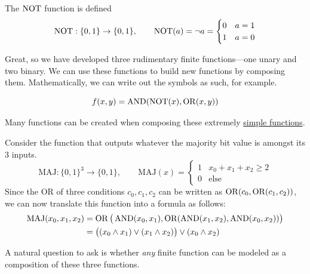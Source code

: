   \begin{definition}
    \label{def:not-function}
    The $\operatorname{NOT}$ function is defined 
    \begin{equation}
      \operatorname{NOT}: \{0,1\} \to \{0,1\}, \qquad 
      \operatorname{NOT} (a) = \lnot a = \begin{cases}
        0 & a = 1 \\
        1 & a = 0
      \end{cases}
    \end{equation}
  \end{definition}

  Great, so we have developed three rudimentary finite functions---one unary and two binary. We can use these functions to build new functions by composing them. Mathematically, we can write out the symbols as such, for example. 

  \begin{equation}
    f(x, y) = \operatorname{AND}(\operatorname{NOT}(x), \operatorname{OR}(x, y)) 
  \end{equation}

  Many functions can be created when composing these extremely \hyperref[mt-def:simple-functions]{simple functions}. 

  \begin{example}
    \label{ex:majority-function}
    Consider the function that outputs whatever the majority bit value is amongst its 3 inputs. 
    \begin{equation}
      \mathrm{MAJ}: \{0,1\}^3 \to \{0,1\}, \qquad 
      \mathrm{MAJ} (x) = \begin{cases}
        1 & x_0 + x_1 + x_2 \geq 2 \\
        0 & \text{else}
      \end{cases}
    \end{equation}
    Since the OR of three conditions $c_0, c_1, c_2$ can be written as $\operatorname{OR}(c_0, \operatorname{OR}(c_1, c_2))$, we can now translate this function into a formula as follows: 
    \begin{align}
      \mathrm{MAJ}(x_0, x_1, x_2) & = \operatorname{OR}\big( \operatorname{AND} (x_0, x_1), \operatorname{OR}(\operatorname{AND}(x_1, x_2), \operatorname{AND}(x_0, x_2)) \big) \\
      & = \big((x_0 \wedge x_1) \vee (x_1 \wedge x_2)\big) \vee (x_0 \wedge x_2)
    \end{align}
  \end{example}

  A natural question to ask is whether \textit{any} finite function can be modeled as a composition of these three functions. 

